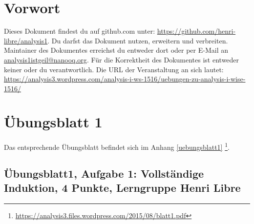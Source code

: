 \documentclass[12pt,a4paper]{report}
\begin{document}
\newcommand \GruppeA {Lerngruppe Henri Libre}

	\tableofcontents
	\newpage
	
	\chapter{Vorwort}
	Dieses Dokument findest du auf github.com unter: \href{https://github.com/henri-libre/analysis1}{https://github.com/henri-libre/analysis1}. Du darfst das Dokument nutzen, erweitern und verbreiten. Maintainer des Dokumentes erreichst du entweder dort oder per E-Mail an \href{analysis1istgeil@nanooq.org}{analysis1istgeil@nanooq.org}. Für die Korrektheit des Dokumentes ist entweder keiner oder du verantwortlich. Die URL der Veranstaltung an sich lautet: \href{https://analysis3.wordpress.com/analysis-i-ws-1516/uebungen-zu-analysis-i-wise-1516/}{https://analysis3.wordpress.com/analysis-i-ws-1516/uebungen-zu-analysis-i-wise-1516/}
	
	\setcounter{chapter}{1}
\chapter*{Übungsblatt 1}
	
	Das entsprechende Übungsblatt befindet sich im Anhang \ref{uebungsblatt1} \footnote{\href{https://analysis3.files.wordpress.com/2015/08/blatt1.pdf}{https://analysis3.files.wordpress.com/2015/08/blatt1.pdf}}.

\newpage		
\section{Übungsblatt1, Aufgabe 1: Vollständige Induktion, 4 Punkte, \GruppeA}
	
\end{document}
